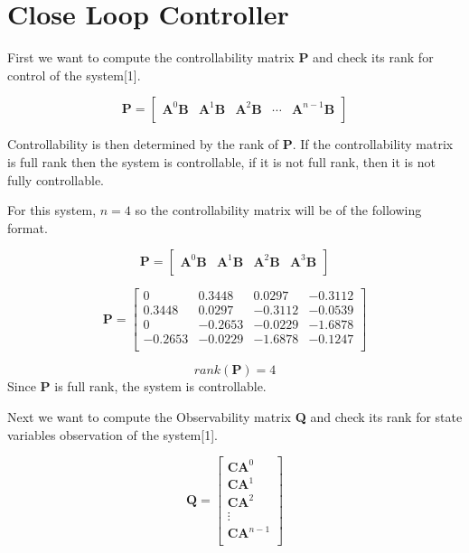 \documentclass[titlepage]{article}
\begin{document}
\newpage
\section{Close Loop Controller}
	First we want to compute the controllability matrix \textbf{P} and check its rank for control of the system[1].

	\[\textbf{P} = \begin{bmatrix}
		\textbf{A}^{0}\textbf{B} & \textbf{A}^{1}\textbf{B} & \textbf{A}^{2}\textbf{B} & \cdots & \textbf{A}^{n-1}\textbf{B}\\
	\end{bmatrix}\]

	Controllability is then determined by the rank of \textbf{P}. If the controllability matrix is full rank then the system is controllable, if it is not full rank, then it is not fully controllable.

	For this system, \(n=4\) so the controllability matrix will be of the following format.

	\[\textbf{P} = \begin{bmatrix}
		\textbf{A}^{0}\textbf{B} & \textbf{A}^{1}\textbf{B} & \textbf{A}^{2}\textbf{B}& \textbf{A}^{3}\textbf{B}\\
		\end{bmatrix}\]

	\[\textbf{P} =
	\begin{bmatrix}
		0 & 0.3448 & 0.0297 & -0.3112\\
		0.3448 & 0.0297 & -0.3112 & -0.0539\\
		0 & -0.2653& -0.0229 & -1.6878\\
		-0.2653 & -0.0229 & -1.6878 & -0.1247\\
	\end{bmatrix}\]

	\[rank\left(\textbf{P}\right) = 4\]
	Since \textbf{P} is full rank, the system is controllable.

	Next we want to compute the Observability matrix \textbf{Q} and check its rank for state variables observation of the system[1].

	\[\textbf{Q} = \begin{bmatrix}
		\textbf{C}\textbf{A}^{0}\\
		\textbf{C}\textbf{A}^{1}\\
		\textbf{C}\textbf{A}^{2}\\
		\vdots\\
		\textbf{C}\textbf{A}^{n-1}\\
	\end{bmatrix}\]
\end{document}
